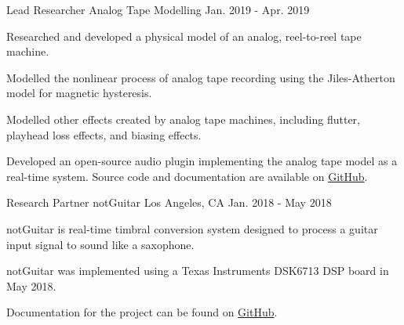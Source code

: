 \begin{cventries}
  \cventry
    {Lead Researcher} %
    {Analog Tape Modelling} %
    {} %
    {Jan. 2019 - Apr. 2019} %
    {
        \begin{cvitems}
              \item{Researched and developed a physical model of an analog, reel-to-reel tape machine.}
              \item{Modelled the nonlinear process of analog tape recording using the Jiles-Atherton model for magnetic hysteresis.}
              \item{Modelled other effects created by analog tape machines, including flutter, playhead loss effects, and biasing effects.}
              \item{Developed an open-source audio plugin implementing the analog tape model as a real-time system.
                    Source code and documentation are available on \href{https://github.com/jatinchowdhury18/AnalogTapeModel}{GitHub}.}
        \end{cvitems}
    }


  \cventry
    {Research Partner} %
    {notGuitar} %
    {Los Angeles, CA} %
    {Jan. 2018 - May 2018} %
    {
      \begin{cvitems} %
        \item {notGuitar is real-time timbral conversion system designed to process a guitar input signal to sound like a saxophone.}
        \item {notGuitar was implemented using a Texas Instruments DSK6713 DSP board in May 2018.}
        \item {Documentation for the project can be found on \href{https://github.com/jatinchowdhury18/notGuitar}{GitHub}.}
      \end{cvitems}
    }

\end{cventries}
